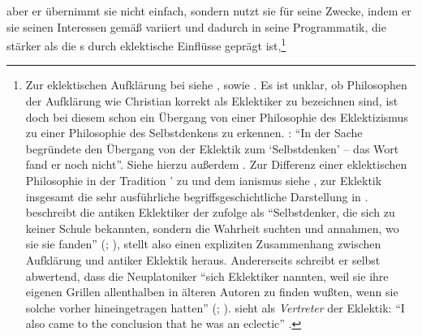 aber er übernimmt sie nicht einfach, sondern nutzt sie für seine Zwecke, indem
er sie seinen Interessen gemäß variiert und dadurch in seine Programmatik, die
stärker als die s durch eklektische Einflüsse geprägt
ist,\footnote{\label{Anmerkung:BegriffderEklektik}Zur
eklektischen Aufklärung bei  siehe
\cite[][398--416]{Albrecht:Eklektik1994}, sowie
\cite{Gerlach:EklektizismusoderFundamentalphilosophie?2001}.
Es ist unklar, ob Philosophen der Aufklärung wie Christian
 korrekt als Eklektiker zu bezeichnen sind, ist doch
bei diesem schon ein Übergang von einer Philosophie des Eklektizismus zu einer
Philosophie des Selbstdenkens zu erkennen.
\cite[Vgl.][403]{Albrecht:Eklektik1994}: \enquote{In der Sache begründete
 den Übergang von der Eklektik zum
\enquote{Selbstdenken} -- das Wort fand er noch nicht}. Siehe hierzu außerdem
\cite{Albrecht:Thomasius--keinEklektiker?1989,Holzhey:PhilosophiealsEklektik1983,Schneiders:VernuenftigerZweifelundwahreEklektik1985}.
Zur Differenz einer eklektischen Philosophie in der Tradition
' zu  und
dem ianismus siehe
\textcite{Gerlach:EklektizismusoderFundamentalphilosophie?2001}, zur Eklektik
insgesamt die sehr ausführliche begriffsgeschichtliche Darstellung in
\textcite[][hier v.\,a.\ \pno~398-603]{Albrecht:Eklektik1994}.
 beschreibt die antiken Eklektiker der {\jaeschelogik}
zufolge als \enquote{Selbstdenker, die sich zu keiner Schule bekannten, sondern
die Wahrheit suchten und annahmen, wo sie sie fanden} \mkbibparens{\cite[][A
37]{Kant:ImmanuelKantsLogik1977}; \cite[][IX:
31.29--30]{Kant:GesammelteWerke1900ff.}}, stellt also einen expliziten
Zusammenhang zwischen Aufklärung und antiker Eklektik heraus.
Andererseits schreibt er selbst abwertend, dass die Neuplatoniker \enquote{sich
Eklektiker nannten, weil sie ihre eigenen Grillen allenthalben in älteren
Autoren zu finden wußten, wenn sie solche vorher hineingetragen hatten}
\mkbibparens{\cite[][A 324]{Kant:Washeisst:SichimDenkenorientieren?1977};
\cite[][VIII: 144.34--36]{Kant:GesammelteWerke1900ff.}}.
sieht  als \emph{Vertreter} der Eklektik:
\enquote{I also came to the conclusion that he was an
 eclectic}
\parencite[][139]{Tonelli:ConditionsinKoenigsbergandtheMakingofKantsPhilosophy1975}.
}
